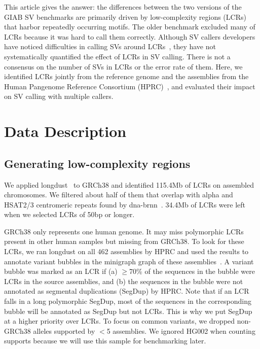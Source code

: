 \documentclass[a4paper,num-refs]{oup-contemporary}
\begin{document}
This article gives the answer:
the differences between the two versions of the GIAB SV benchmarks
are primarily driven by low-complexity regions (LCRs) that harbor repeatedly occurring motifs.
The older benchmark excluded many of LCRs because it was hard to call them correctly.
Although SV callers developers have noticed difficulties in calling SVs around LCRs~\cite{Zook:2020aa,Smolka:2024ab,Keskus:2025aa},
they have not systematically quantified the effect of LCRs in SV calling.
There is not a consensus on the number of SVs in LCRs or the error rate of them.
Here, we identified LCRs jointly from the reference genome
and the assemblies from the Human Pangenome Reference Consortium (HPRC)~\cite{Liao:2023aa},
and evaluated their impact on SV calling with multiple callers.


\section{Data Description}

\subsection{Generating low-complexity regions}

We applied longdust~\cite{Li:2025aa} to GRCh38 and identified 115.4Mb of LCRs on assembled chromosomes.
We filtered about half of them that overlap with alpha and HSAT2/3 centromeric repeats found by dna-brnn~\cite{Li:2019aa}.
34.4Mb of LCRs were left when we selected LCRs of 50bp or longer.

GRCh38 only represents one human genome.
It may miss polymorphic LCRs present in other human samples but missing from GRCh38.
To look for these LCRs, we ran longdust on all 462 assemblies by HPRC
and used the results to annotate variant bubbles in the minigraph graph of these assemblies~\cite{Li:2020aa}.
A variant bubble was marked as an LCR if (a) $\ge$70\% of the sequences in the bubble were LCRs in the source assemblies, and
(b) the sequences in the bubble were not annotated as segmental duplications (SegDup) by HPRC.
Note that if an LCR falls in a long polymorphic SegDup, most of the sequences in the corresponding bubble will be annotated as SegDup but not LCRs.
This is why we put SegDup at a higher priority over LCRs.
To focus on common variants, we dropped non-GRCh38 alleles supported by $<$5 assemblies.
We ignored HG002 when counting supports because we will use this sample for benchmarking later.
\end{document}
